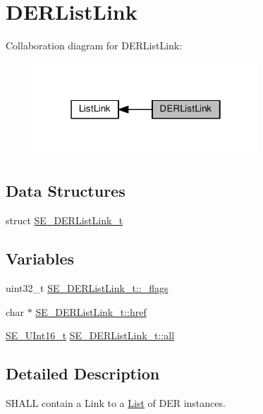 \hypertarget{group__DERListLink}{}\section{D\+E\+R\+List\+Link}
\label{group__DERListLink}
Collaboration diagram for D\+E\+R\+List\+Link\+:\nopagebreak
\begin{figure}[H]
\begin{center}
\leavevmode
\includegraphics[width=238pt]{group__DERListLink}
\end{center}
\end{figure}
\subsection*{Data Structures}
\begin{DoxyCompactItemize}
\item 
struct \hyperlink{structSE__DERListLink__t}{S\+E\+\_\+\+D\+E\+R\+List\+Link\+\_\+t}
\end{DoxyCompactItemize}
\subsection*{Variables}
\begin{DoxyCompactItemize}
\item 
uint32\+\_\+t \hyperlink{group__DERListLink_gaee6ce628f2091dcf88d52810ed657455}{S\+E\+\_\+\+D\+E\+R\+List\+Link\+\_\+t\+::\+\_\+flags}
\item 
char $\ast$ \hyperlink{group__DERListLink_ga4df96d560e9da39b6341abac4a6edee6}{S\+E\+\_\+\+D\+E\+R\+List\+Link\+\_\+t\+::href}
\item 
\hyperlink{group__UInt16_gac68d541f189538bfd30cfaa712d20d29}{S\+E\+\_\+\+U\+Int16\+\_\+t} \hyperlink{group__DERListLink_ga174e67e5b734894a91aa477c422cc07c}{S\+E\+\_\+\+D\+E\+R\+List\+Link\+\_\+t\+::all}
\end{DoxyCompactItemize}


\subsection{Detailed Description}
S\+H\+A\+LL contain a Link to a \hyperlink{structList}{List} of D\+ER instances. 

